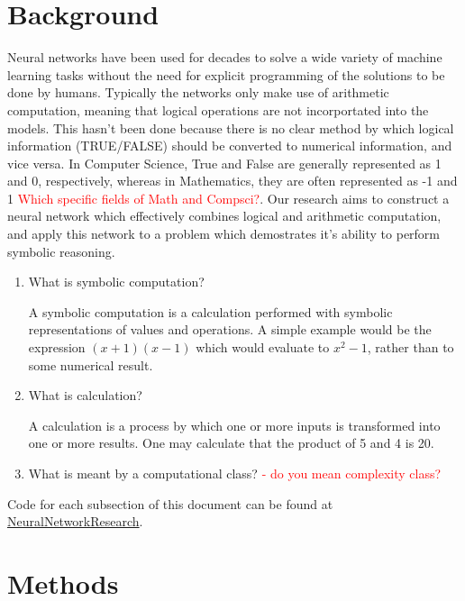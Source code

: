 \documentclass{article}
\begin{document}
\section{Background}

	Neural networks have been used for decades to solve a wide variety of machine learning tasks without the need for explicit programming of the solutions to be done by humans. Typically the networks only make use of arithmetic computation, meaning that logical operations are not incorportated into the models. This hasn't been done because there is no clear method by which logical information (TRUE/FALSE) should be converted to numerical information, and vice versa. In Computer Science, True and False are generally represented as 1 and 0, respectively, whereas in Mathematics, they are often represented as -1 and 1 \textcolor{red}{Which specific fields of Math and Compsci?}. Our research aims to construct a neural network which effectively combines logical and arithmetic computation, and apply this network to a problem which demostrates it's ability to perform symbolic reasoning.
	
    \begin{enumerate}
        \item What is symbolic computation?
        
        A symbolic computation is a calculation performed with symbolic representations of values and operations. A simple example would be the expression $(x + 1)(x - 1)$ which would evaluate to $x^2 - 1$, rather than to some numerical result.

        \item What is calculation?
        
        A calculation is a process by which one or more inputs is transformed into one or more results. One may calculate that the product of 5 and 4 is 20.
        
        \item What is meant by a computational class? \textcolor{red}{- do you mean complexity class?}
        
        
    \end{enumerate}
    
     Code for each subsection of this document can be found at \href{https://github.com/DariusBxsci/NeuralNetworkResearch/tree/master/NeuralNets}{NeuralNetworkResearch}. 


\section{Methods}
\end{document}
